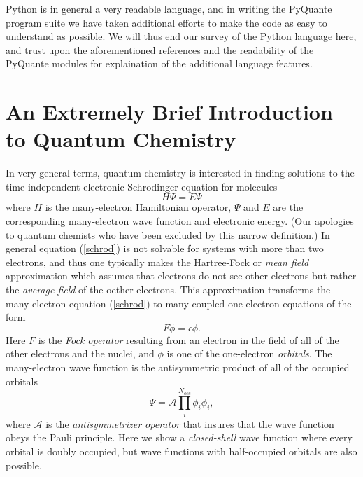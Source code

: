 \documentclass[twocolumn]{revtex4}
\begin{document}
Python is in general a very readable language, and in writing the
PyQuante program suite we have taken additional efforts to make the
code as easy to understand as possible. We will thus end our survey of
the Python language here, and trust upon the aforementioned references
and the readability of the PyQuante modules for explaination of the
additional language features.

\section{An Extremely Brief Introduction to Quantum Chemistry}
In very general terms, quantum chemistry is interested in finding
solutions to the time-independent electronic Schrodinger equation for
molecules
\begin{equation}
H\Psi = E\Psi
\label{schrod}
\end{equation}
where $H$ is the many-electron Hamiltonian operator, $\Psi$ and
$E$ are the corresponding many-electron wave function and electronic
energy. (Our apologies to quantum chemists who have been excluded by
this narrow definition.) In general equation (\ref{schrod}) is not
solvable for systems with more than two electrons, and thus one
typically makes the Hartree-Fock or \emph{mean field} approximation
which assumes that electrons do not see other electrons but rather the
\emph{average field} of the oether electrons. This approximation
transforms the many-electron equation (\ref{schrod}) to many coupled
one-electron equations of the form
\begin{equation}
F\phi = \epsilon\phi.
\label{fock}
\end{equation}
Here $F$ is the \emph{Fock operator} resulting from an electron in the
field of all of the other electrons and the nuclei, and $\phi$ is one
of the one-electron \emph{orbitals}. The many-electron wave function
is the antisymmetric product of all of the occupied orbitals
\begin{equation}
\Psi = \mathcal{A}\prod_i^{N_{occ}}\phi_i\phi_i,
\end{equation}
where $\mathcal{A}$ is the \emph{antisymmetrizer operator} that insures
that the wave function obeys the Pauli principle. Here we show a
\emph{closed-shell} wave function where every orbital is doubly
occupied, but wave functions with half-occupied orbitals are also
possible. 
\end{document}
